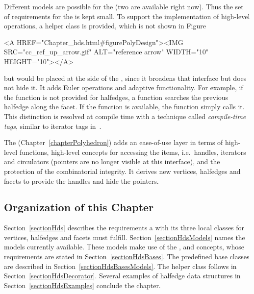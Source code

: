 Different models are possible for the 
(two are available right now).  Thus the set of requirements for the
 is kept small. To support the
implementation of high-level operations, a helper class
 is provided, which is not
shown in Figure~\ccTexHtml{\ref{figurePolyDesign}}{}\begin{ccHtmlOnly}
  <A HREF="Chapter_hds.html#figurePolyDesign"><IMG 
  SRC="cc_ref_up_arrow.gif" ALT="reference arrow" WIDTH="10" HEIGHT="10"></A>
\end{ccHtmlOnly}
 but would be placed at the side
of the , since it broadens that interface
but does not hide it. It adds Euler operations and adaptive
functionality.  For example, if the  function is not
provided for halfedges, a  function searches the
previous halfedge along the facet. If the  function is 
available, the  function simply calls it. This
distinction is resolved at compile time with a technique called {\em
  compile-time tags}, similar to iterator tags in~\cite{sl-stl-95}.

The  (Chapter~\ref{chapterPolyhedron}) adds an 
ease-of-use layer in terms of high-level
functions, high-level concepts for accessing the items, i.e.~handles,
iterators and circulators (pointers are no longer visible at this
interface), and the protection of the combinatorial integrity. It
derives new vertices, halfedges and facets to provide the handles and
hide the pointers.

\subsection*{Organization of this Chapter}

Section~\ref{sectionHds} describes the requirements a
 with its three local classes for
vertices, halfedges and facets must fulfill.
Section~\ref{sectionHdsModels} names the models currently available.
These models make use of the , 
and  concepts, whose requirements are stated in
Section~\ref{sectionHdsBases}. The predefined base classes are
described in Section~\ref{sectionHdsBasesModels}. The helper class
 follows in
Section~\ref{sectionHdsDecorator}. Several examples of halfedge data
structures in Section~\ref{sectionHdsExamples} conclude the chapter.


